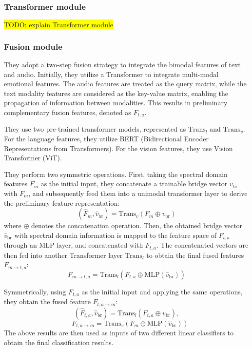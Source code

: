 \documentclass{article}
\begin{document}
\subsubsection{Transformer module}
\colorbox{yellow}{TODO: explain Transformer module}\\


\subsubsection{Fusion module}
They adopt a two-step fusion strategy to integrate the bimodal features of text and audio. Initially, they utilize a Transformer to integrate multi-modal emotional features. The audio features are treated as the query matrix, while the text modality features are considered as the key-value matrix, enabling the propagation of information between modalities. This results in preliminary complementary fusion features, denoted as $F_{t,a}$.

They use two pre-trained transformer models, represented as $\text{Trans}_l$ and $\text{Trans}_v$. For the language features, they utilize BERT (Bidirectional Encoder Representations from Transformers). For the vision features, they use Vision Transformer (ViT).

They perform two symmetric operations. First, taking the spectral domain features $F_m$ as the initial input, they concatenate a trainable bridge vector $v_{\text{br}}$ with $F_m$, and subsequently feed them into a unimodal transformer layer to derive the preliminary feature representation:
\[
(\hat{F}_m, \hat{v}_{\text{br}}) = \text{Trans}_v(F_m \oplus v_{\text{br}})
\]
where $\oplus$ denotes the concatenation operation. Then, the obtained bridge vector $\hat{v}_{\text{br}}$ with spectral domain information is mapped to the feature space of $F_{t,a}$ through an MLP layer, and concatenated with $F_{t,a}$. The concatenated vectors are then fed into another Transformer layer $\text{Trans}_l$ to obtain the final fused features $F_{m \rightarrow t,a}$:
\[
F_{m \rightarrow t,a} = \text{Trans}_l(F_{t,a} \oplus \text{MLP}(\hat{v}_{\text{br}}))
\]

Symmetrically, using $F_{t,a}$ as the initial input and applying the same operations, they obtain the fused feature $F_{t,a \rightarrow m}$:
\[
(\hat{F}_{t,a}, \hat{v}_{\text{br}}) = \text{Trans}_l(F_{t,a} \oplus v_{\text{br}}),
\]
\[
 \quad
F_{t,a \rightarrow m} = \text{Trans}_v(F_m \oplus \text{MLP}(\hat{v}_{\text{br}}))
\]
The above results are then used as inputs of two different linear classifiers to obtain the final classification results.
\end{document}
